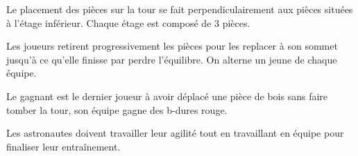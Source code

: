 \documentclass{grand-jeu}
\begin{document}
\begin{liste-materiel}
\end{liste-materiel}

\begin{regles}
Le placement des pièces sur la tour se fait perpendiculairement aux pièces situées à l'étage inférieur. Chaque étage est composé de 3 pièces.

Les joueurs retirent progressivement les pièces pour les replacer à son sommet jusqu'à ce qu'elle finisse par perdre l'équilibre. On alterne un jeune de chaque équipe.

Le gagnant est le dernier joueur à avoir déplacé une pièce de bois sans faire tomber la tour, son équipe gagne des b-dures rouge.
\end{regles}

\begin{imaginaire}
Les astronautes doivent travailler leur agilité tout en travaillant en équipe pour finaliser leur entraînement. 
\end{imaginaire}

\begin{moments-stop}
\end{moments-stop}
\end{document}
